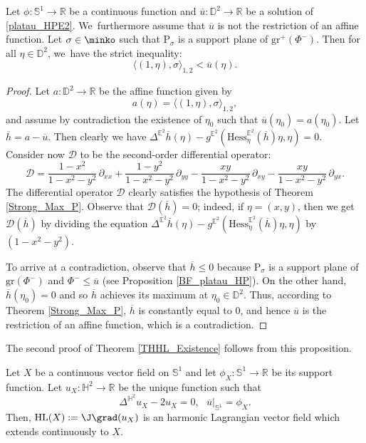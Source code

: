 \begin{lemma}\label{mean_up_convex_core}
Let $\phi: \mathbb{S}^1 \to \mathbb{R}$ be a continuous function and $\overline{u}: \mathbb{D}^2 \to \mathbb{R}$ be a solution of \eqref{platau_HPE2}. We~furthermore assume that $\overline{u}$ is not the restriction of an affine function. Let $\sigma \in \minko$ such that $\mathrm{P}_{\sigma}$ is a support plane of $\mathrm{gr}^+(\Phi^-)$. Then for all $\eta \in \mathbb{D}^2$, we~have the strict inequality:
\[
\langle (1,\eta), \sigma \rangle_{1,2} < \overline{u}(\eta).
\]
\end{lemma}

\begin{proof}
Let $a: \mathbb{D}^2 \to \mathbb{R}$ be the affine function given by
\[
a(\eta) = \langle (1,\eta), \sigma \rangle_{1,2},
\]
and assume by contradiction the existence of $\eta_0$ such that $\overline{u}(\eta_0) = a(\eta_0)$. Let $\overline{h} = a - \overline{u}$. Then clearly we have $\Delta^{\mathbb{E}^2}\overline{h}(\eta) - g^{\mathbb{E}^2}(\mathrm{Hess}^{\mathbb{E}^2}_\eta(\overline{h})\eta, \eta) = 0$.\\
Consider now $\mathcal{D}$ to be the second-order differential operator:
\begin{equation}\label{strictelliptic}
\mathcal{D} = \frac{1-x^2}{1-x^2-y^2}\,\partial_{xx} + \frac{1-y^2}{1-x^2-y^2}\,\partial_{yy} - \frac{xy}{1-x^2-y^2}\,\partial_{xy} - \frac{xy}{1-x^2-y^2}\,\partial_{yx}.
\end{equation}
The differential operator $\mathcal{D}$ clearly satisfies the hypothesis of Theorem \ref{Strong_Max_P}. Observe that $\mathcal{D}(\overline{h}) = 0$; indeed, if $\eta = (x,y)$, then we get $\mathcal{D}(\overline{h})$ by dividing the equation $\Delta^{\mathbb{E}^2}\overline{h}(\eta) - g^{\mathbb{E}^2}(\mathrm{Hess}^{\mathbb{E}^2}_\eta(\overline{h})\eta, \eta)$ by $(1-x^2-y^2)$.

To arrive at a contradiction, observe that $\overline{h} \leq 0$ because $\mathrm{P}_{\sigma}$ is a support plane of $\mathrm{gr}(\Phi^-)$ and $\Phi^- \leq \overline{u}$ (see Proposition \ref{BF_platau_HP}). On the other hand, $\overline{h}(\eta_0) = 0$ and so $\overline{h}$ achieves its maximum at $\eta_0 \in \mathbb{D}^2$. Thus, according to Theorem \ref{Strong_Max_P}, $\overline{h}$ is constantly equal to $0$, and hence $\overline{u}$ is the restriction of an affine function, which is a contradiction.
\end{proof}
The second proof of Theorem \ref{THHL_Existence} follows from this proposition.
\begin{prop}\label{second_proof}
Let $X$ be a continuous vector field on $\mathbb{S}^1$ and let $\phi_X:\mathbb{S}^1\to\mathbb{R}$ be its support function. Let $u_X:\mathbb{H}^2\to\mathbb{R}$ be the unique function such that \begin{equation}\label{platau_HP_proof}
\Delta^{\mathbb{H}^2} u_X-2u_X=0 ,\ \ \ \overline{u}|_{\mathbb{S}^1}=\phi_X.
\end{equation}
Then, $\mathrm{HL}(X):=\J\grad(u_X)$ is an harmonic Lagrangian vector field which extends continuously to $X$.
\end{prop}
